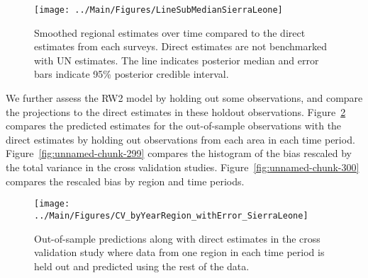 \documentclass[12pt]{article}\usepackage[]{graphicx}\usepackage[]{color}
\newenvironment{knitrout}{}{} %
\begin{document}
\begin{knitrout}
\color{fgcolor}\begin{figure}[bht]

{\centering \texttt{[image: ../Main/Figures/LineSubMedianSierraLeone]} 

}

\caption[Smoothed regional estimates over time compared to the direct estimates from each surveys]{Smoothed regional estimates over time compared to the direct estimates from each surveys. Direct estimates are not benchmarked with UN estimates. The line indicates posterior median and error bars indicate 95\% posterior credible interval.}\label{fig:unnamed-chunk-297}
\end{figure}


\end{knitrout}
We further assess the RW2 model by holding out some observations, and compare the projections to the direct estimates in these holdout observations. Figure~\ref{fig:unnamed-chunk-298} compares the predicted estimates for the out-of-sample observations  with the direct estimates by holding out observations from each area in each time period.  Figure~\ref{fig:unnamed-chunk-299} compares the histogram of the bias rescaled by the total variance in the cross validation studies. Figure~\ref{fig:unnamed-chunk-300} compares the rescaled bias by region and time periods.



 
\begin{knitrout}
\color{fgcolor}\begin{figure}[bht]

{\centering \texttt{[image: ../Main/Figures/CV\_byYearRegion\_withError\_SierraLeone]} 

}

\caption[Out-of-sample predictions along with direct estimates in the cross validation study where data from one region in each time period is held out and predicted using the rest of the data]{Out-of-sample predictions along with direct estimates in the cross validation study where data from one region in each time period is held out and predicted using the rest of the data.}\label{fig:unnamed-chunk-298}
\end{figure}


\end{knitrout}
\end{document}
